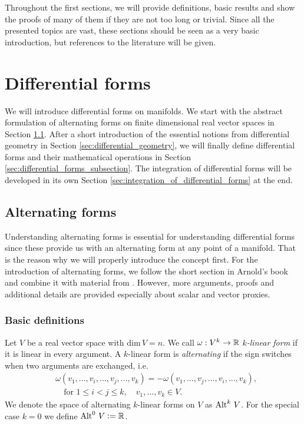 \documentclass[../master_thesis.tex]{subfiles}
\begin{document}
Throughout the first sections, we will provide 
definitions, basic results and show the proofs of many of them if they are not too 
long or trivial. Since all the presented topics are vast, these sections should be 
seen as a very basic introduction, but references to the literature will be given.

\section{Differential forms}\label{sec:differential_forms}

We will introduce differential forms on manifolds. We start with the abstract 
formulation of alternating forms on finite dimensional real vector spaces 
in Section \ref{sec:alternating_maps}. After a short introduction of 
the essential notions from differential geometry in Section \ref{sec:differential_geometry},
we will finally define differential forms and their mathematical operations
in Section \ref{sec:differential_forms_subsection}. The integration 
of differential forms will be developed in its own Section \ref{sec:integration_of_differential_forms} 
at the end.

\subsection{Alternating forms} \label{sec:alternating_maps}

Understanding alternating forms is essential for understanding differential forms 
since these provide us with an alternating form at any point of a manifold. 
That is the reason why we will properly introduce the concept first.
For the introduction of alternating forms, we follow
the short section in Arnold's book
\cite[Sec. 6.1.]{arnold} and combine it 
with material from \cite[Sec.\,V.1]{topology_and_geometry}.
However, more arguments, proofs and additional details are provided especially  
about scalar and vector proxies.

\subsubsection{Basic definitions}

\begin{definition}
    Let $V$ be a real vector space with $\text{dim}\,V = n$.
    We call $\omega: V^k \rightarrow \mathbb{R}$ 
    \textit{$k$-linear form} if it is linear in every argument.
    A $k$-linear form is 
    \textit{alternating} if the sign switches when two arguments are exchanged, 
    i.e.
    \begin{align*}
        &\omega(v_1,...,v_i,...,v_j,...,v_k)
        = - \omega(v_1,...,v_j,...,v_i,...,v_k), 
        \\& \quad \text{for } 1\leq i < j \leq k,
        \quad v_1,...,v_k \in V.
    \end{align*}
    We denote the space of alternating $k$-linear forms on $V$ as ${\operatorname{Alt}^{k}\,V}$.
    For the special case $k=0$ we define ${\operatorname{Alt}^{0}\,V} \vcentcolon= \mathbb{R}$.
\end{definition}
\end{document}
